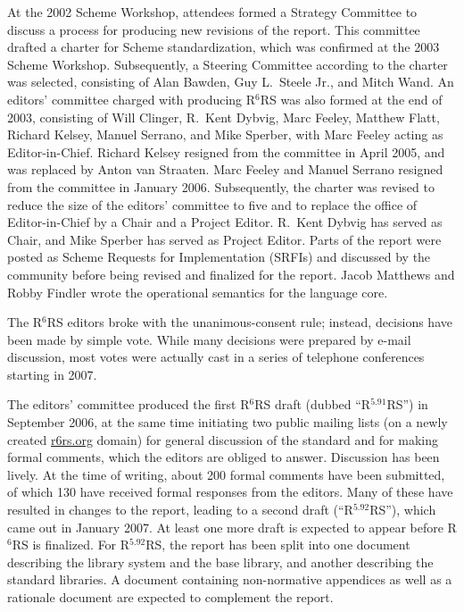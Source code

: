 \documentclass{acm_proc_article-sp}
\newcommand{\rn}[1]{R$^{#1}$RS}
\begin{document}
At the 2002 Scheme Workshop, attendees formed a Strategy Committee to
discuss a process for producing new revisions of the report.  This
committee drafted a charter for Scheme standardization, which was
confirmed at the 2003 Scheme Workshop.  Subsequently, a Steering
Committee according to the charter was selected, consisting of Alan
Bawden, Guy L.\ Steele Jr., and Mitch Wand.  An editors' committee
charged with producing \rn{6} was also formed at the end of 2003,
consisting of Will Clinger, R.\ Kent Dybvig, Marc Feeley, Matthew
Flatt, Richard Kelsey, Manuel Serrano, and Mike Sperber, with Marc
Feeley acting as Editor-in-Chief.  Richard Kelsey resigned from the
committee in April 2005, and was replaced by Anton van Straaten.  Marc
Feeley and Manuel Serrano resigned from the committee in January 2006.
Subsequently, the charter was revised to reduce the size of the
editors' committee to five and to replace the office of
Editor-in-Chief by a Chair and a Project Editor.  R.\ Kent Dybvig
has served as Chair, and Mike Sperber has served as Project Editor.  Parts of
the report were posted as Scheme Requests for Implementation (SRFIs)
and discussed by the community before being revised and finalized for
the report.  Jacob Matthews and Robby Findler wrote the operational
semantics for the language core.

The \rn{6} editors broke with the unanimous-consent rule; instead,
decisions have been made by simple vote.  While many decisions were
prepared by e-mail discussion, most votes were actually cast in a
series of telephone conferences starting in 2007.

The editors' committee produced the first \rn{6} draft (dub\-bed
``\rn{5.91}'') in September 2006, at the same time initiating two
public mailing lists (on a newly created \url{r6rs.org} domain) for general
discussion of the standard and for making formal comments, which the
editors are obliged to answer.  Discussion has been lively.  At the
time of writing, about 200 formal comments have been submitted, of which 130
have received formal responses from the editors.  Many
of these have resulted in changes to the report, leading to a
second draft (``\rn{5.92}''), which came out in January 2007.  At least one
more draft is expected to appear before \rn{6} is finalized.  For
\rn{5.92}, the report has been split into one document describing the
library system and the base library, and another describing the
standard libraries.  A document containing non-normative appendices as
well as a rationale document are expected to complement the 
report.
\end{document}
